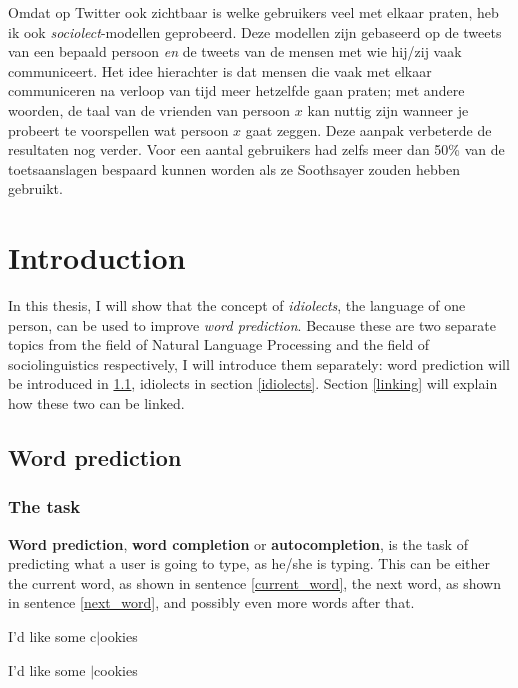 \documentclass[12pt]{article}
\let\stdsection\section
\renewcommand\section{\newpage\stdsection}
\begin{document}
Omdat op Twitter ook zichtbaar is welke gebruikers veel met elkaar praten, heb ik ook \emph{sociolect}-modellen geprobeerd. Deze modellen zijn gebaseerd op de tweets van een bepaald persoon \emph{en} de tweets van de mensen met wie hij/zij vaak communiceert. Het idee hierachter is dat mensen die vaak met elkaar communiceren na verloop van tijd meer hetzelfde gaan praten; met andere woorden, de taal van de vrienden van persoon $x$ kan nuttig zijn wanneer je probeert te voorspellen wat persoon $x$ gaat zeggen. Deze aanpak verbeterde de resultaten nog verder. Voor een aantal gebruikers had zelfs meer dan 50\% van de toetsaanslagen bespaard kunnen worden als ze Soothsayer zouden hebben gebruikt.

\section{Introduction} \label{intro}

In this thesis, I will show that the concept of \emph{idiolects}, the language of one person, can be used to improve \emph{word prediction}. Because these are two separate topics from the field of Natural Language Processing and the field of sociolinguistics respectively, I will introduce them separately: word prediction will be introduced in \ref{word_prediction}, idiolects in section \ref{idiolects}. Section \ref{linking} will explain how these two can be linked.

\subsection{Word prediction} \label{word_prediction}

\subsubsection{The task}

\textbf{Word prediction}, \textbf{word completion} or \textbf{autocompletion}, is the task of predicting what a user is going to type, as he/she is typing. This can be either the current word, as shown in sentence \ref{current_word}, the next word, as shown in sentence \ref{next_word}, and possibly even more words after that. 
\begin{examples}
\item I'd like some c$|$ookies \label{current_word}
\item I'd like some $|$cookies \label{next_word}
\end{examples}
\end{document}

